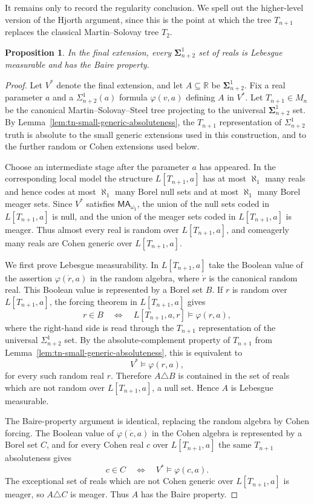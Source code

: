 \documentclass[a4paper,11pt]{article}
\newtheorem{proposition}[theorem]{Proposition}
\newcommand{\MA}{\mathsf{MA_{\omega_1}}}
\begin{document}
It remains only to record the regularity conclusion.  We spell out the
higher-level version of the Hjorth argument, since this is the point at which
the tree $T_{n+1}$ replaces the classical Martin--Solovay tree $T_2$.

\begin{proposition}\label{Mn-regularity}
In the final extension, every $\boldsymbol{\Sigma}^1_{n+2}$ set of reals is
Lebesgue measurable and has the Baire property.
\end{proposition}

\begin{proof}
Let $V^*$ denote the final extension, and let
$A\subseteq\mathbb R$ be $\boldsymbol{\Sigma}^1_{n+2}$.  Fix a real parameter
$a$ and a $\Sigma^1_{n+2}(a)$ formula $\varphi(v,a)$ defining $A$ in $V^*$.
Let $T_{n+1}\in M_n$ be the canonical Martin--Solovay--Steel tree projecting
to the universal $\boldsymbol{\Sigma}^1_{n+2}$ set.  By
Lemma~\ref{lem:tn-small-generic-absoluteness}, the $T_{n+1}$ representation
of $\Sigma^1_{n+2}$ truth is absolute to the small generic extensions used in
this construction, and to the further random or Cohen extensions used below.

Choose an intermediate stage after the parameter $a$ has appeared.  In the
corresponding local model the structure $L[T_{n+1},a]$ has at most
$\aleph_1$ many reals and hence codes at most $\aleph_1$ many Borel null sets
and at most $\aleph_1$ many Borel meager sets.  Since $V^*$ satisfies
$\MA$, the union of the null sets coded in $L[T_{n+1},a]$ is null, and the
union of the meager sets coded in $L[T_{n+1},a]$ is meager.  Thus almost every
real is random over $L[T_{n+1},a]$, and comeagerly many reals are Cohen
generic over $L[T_{n+1},a]$.

We first prove Lebesgue measurability.  In $L[T_{n+1},a]$ take the Boolean
value of the assertion $\varphi(\dot r,a)$ in the random algebra, where
$\dot r$ is the canonical random real.  This Boolean value is represented by a
Borel set $B$.  If $r$ is random over $L[T_{n+1},a]$, the forcing theorem in
$L[T_{n+1},a]$ gives
\[
   r\in B
   \quad\Longleftrightarrow\quad
   L[T_{n+1},a,r]\models \varphi(r,a),
\]
where the right-hand side is read through the $T_{n+1}$ representation of the
universal $\Sigma^1_{n+2}$ set.  By the absolute-complement property of
$T_{n+1}$ from Lemma~\ref{lem:tn-small-generic-absoluteness}, this is
equivalent to
\[
   V^*\models \varphi(r,a),
\]
for every such random real $r$.  Therefore $A\triangle B$ is contained in the
set of reals which are not random over $L[T_{n+1},a]$, a null set.  Hence
$A$ is Lebesgue measurable.

The Baire-property argument is identical, replacing the random algebra by
Cohen forcing.  The Boolean value of $\varphi(\dot c,a)$ in the Cohen algebra
is represented by a Borel set $C$, and for every Cohen real $c$ over
$L[T_{n+1},a]$ the same $T_{n+1}$ absoluteness gives
\[
   c\in C
   \quad\Longleftrightarrow\quad
   V^*\models \varphi(c,a).
\]
The exceptional set of reals which are not Cohen generic over
$L[T_{n+1},a]$ is meager, so $A\triangle C$ is meager.  Thus $A$ has the
Baire property.
\end{proof}
\end{document}

